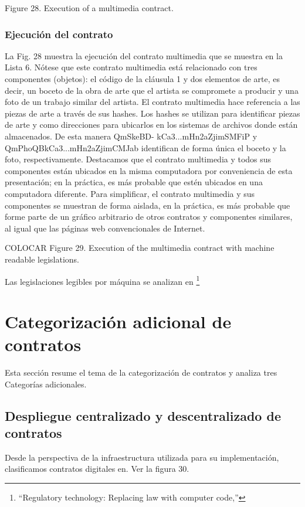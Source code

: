 \documentclass[12pt]{report} %
\begin{document}
\begin{itemize}
Figure 28. Execution of a multimedia contract.

\subsubsection{Ejecución del contrato}

La Fig. 28 muestra la ejecución del contrato multimedia que se muestra en la Lista 6. Nótese que este contrato multimedia está relacionado con tres componentes (objetos): el código de la cláusula 1 y dos elementos de arte, es decir, un boceto de la obra de arte que el artista se compromete a producir y una foto de un trabajo similar del artista. El contrato multimedia hace referencia a las piezas de arte a través de sus hashes. Los hashes se utilizan para identificar piezas de arte y como direcciones para ubicarlos en los sistemas de archivos donde están almacenados. De esta manera QmSkeBD-
kCa3...mHn2aZjimSMFiP y QmPhoQBkCa3...mHn2aZjimCMJab identifican de forma única el boceto y la foto, respectivamente. Destacamos que el contrato multimedia y todos sus componentes están ubicados en la misma computadora por conveniencia de esta presentación; en la práctica, es más probable que estén ubicados en una computadora diferente. Para simplificar, el contrato multimedia y sus componentes se muestran de forma aislada, en la práctica, es más probable que forme parte de un gráfico arbitrario de otros contratos y componentes similares, al igual que las páginas web  convencionales de Internet.

COLOCAR Figure 29. Execution of the multimedia contract with machine readable legislations.

Las legislaciones legibles por máquina se analizan en \footnote{\cite{Eva2020}“Regulatory technology: Replacing law with computer
code,”}

\section{Categorización adicional de contratos}

Esta sección resume el tema de la categorización de contratos y analiza tres
Categorías adicionales.

\subsection{Despliegue centralizado y descentralizado de contratos}

Desde la perspectiva de la infraestructura utilizada para su implementación, clasificamos contratos digitales en. Ver la figura 30.


\end{itemize}
\end{document}
